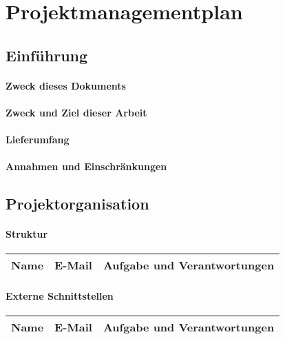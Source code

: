 \chapter{Projektmanagementplan}

\section{Einführung}

\subsubsection*{Zweck dieses Dokuments}

\subsubsection*{Zweck und Ziel dieser Arbeit}

\subsubsection*{Lieferumfang}

\subsubsection*{Annahmen und Einschränkungen}

\section{Projektorganisation}

\subsubsection*{Struktur}

\begin{tabular}[t]{|l|l|l|} \hline
\textbf{Name} & \textbf{E-Mail} & \textbf{Aufgabe und Verantwortungen} \\ \hline \hline
\end{tabular}

\subsubsection*{Externe Schnittstellen}

\begin{tabular}[t]{|l|l|l|} \hline
\textbf{Name} & \textbf{E-Mail} & \textbf{Aufgabe und Verantwortungen} \\ \hline \hline
\end{tabular}

